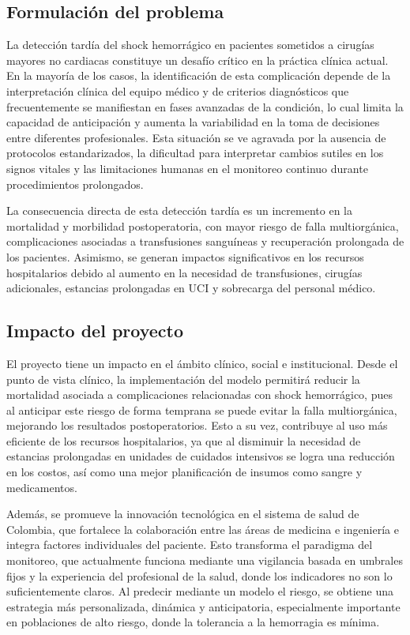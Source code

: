 \documentclass[12pt, letterpaper]{article}
\begin{document}
\subsection{Formulación del problema}

La detección tardía del shock hemorrágico en pacientes sometidos a cirugías mayores no cardiacas constituye un desafío crítico en la práctica clínica actual. En la mayoría de los casos, la identificación de esta complicación depende de la interpretación clínica del equipo médico y de criterios diagnósticos que frecuentemente se manifiestan en fases avanzadas de la condición, lo cual limita la capacidad de anticipación y aumenta la variabilidad en la toma de decisiones entre diferentes profesionales. Esta situación se ve agravada por la ausencia de protocolos estandarizados, la dificultad para interpretar cambios sutiles en los signos vitales y las limitaciones humanas en el monitoreo continuo durante procedimientos prolongados.

La consecuencia directa de esta detección tardía es un incremento en la mortalidad y morbilidad postoperatoria, con mayor riesgo de falla multiorgánica, complicaciones asociadas a transfusiones sanguíneas y recuperación prolongada de los pacientes. Asimismo, se generan impactos significativos en los recursos hospitalarios debido al aumento en la necesidad de transfusiones, cirugías adicionales, estancias prolongadas en UCI y sobrecarga del personal médico.

\subsection{Impacto del proyecto}

El proyecto tiene un impacto en el ámbito clínico, social e institucional. Desde el punto de vista clínico, la implementación del modelo permitirá reducir la mortalidad asociada a complicaciones relacionadas con shock hemorrágico, pues al anticipar este riesgo de forma temprana se puede evitar la falla multiorgánica, mejorando los resultados postoperatorios. Esto a su vez, contribuye al uso más eficiente de los recursos hospitalarios, ya que al disminuir la necesidad de estancias prolongadas en unidades de cuidados intensivos se logra una reducción en los costos, así como una mejor planificación de insumos como sangre y medicamentos.

Además, se promueve la innovación tecnológica en el sistema de salud de Colombia, que fortalece la colaboración entre las áreas de medicina e ingeniería e integra factores individuales del paciente. Esto transforma el paradigma del monitoreo, que actualmente funciona mediante una vigilancia basada en umbrales fijos y la experiencia del profesional de la salud, donde los indicadores no son lo suficientemente claros. Al predecir mediante un modelo el riesgo, se obtiene una estrategia más personalizada, dinámica y anticipatoria, especialmente importante en poblaciones de alto riesgo, donde la tolerancia a la hemorragia es mínima.
\end{document}
